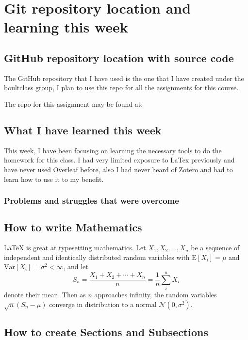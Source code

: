 \documentclass[a4paper]{article}
\begin{document}
\section{Git repository location and learning this week}

\subsection{GitHub repository location with source code}

The GitHub repository that I have used is the one that I have created under the boultclass group, I plan to use 
this repo for all the assignments for this course.

The repo for this assignment may be found at:


\subsection{What I have learned this week}

This week, I have been focusing on learning the necessary tools to do the homework for this class. I had very limited exposure to LaTex previously and have never used Overleaf before, also I had never heard of Zotero and had to learn how to use it to my benefit.

\subsubsection{Problems and struggles that were overcome}


\subsection{How to write Mathematics}

\LaTeX{} is great at typesetting mathematics. Let $X_1, X_2, \ldots, X_n$ be a sequence of independent and identically distributed random variables with $\text{E}[X_i] = \mu$ and $\text{Var}[X_i] = \sigma^2 < \infty$, and let
\[S_n = \frac{X_1 + X_2 + \cdots + X_n}{n}
      = \frac{1}{n}\sum_{i}^{n} X_i\]
denote their mean. Then as $n$ approaches infinity, the random variables $\sqrt{n}(S_n - \mu)$ converge in distribution to a normal $\mathcal{N}(0, \sigma^2)$.


\subsection{How to create Sections and Subsections}
\end{document}
